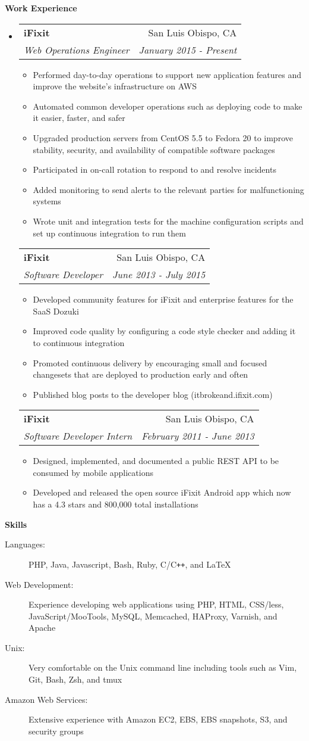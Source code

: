 \documentclass[letterpaper,11pt]{article}
\makeatletter
\newcommand{\resitem}[1]{\item #1 \vspace{-2pt}}
\newcommand{\resheading}[1]{{\large \colorbox{mygrey}{\begin{minipage}{\textwidth}{\textbf{#1 \vphantom{p\^{E}}}}\end{minipage}}}}
\newcommand{\ressubheading}[4]{
\begin{tabular*}{7.0in}{l@{\extracolsep{\fill}}r}
      \textbf{#1} & #2 \\
      \textit{#3} & \textit{#4} \\
\end{tabular*}\vspace{-6pt}}
\makeatother
\begin{document}
\resheading{Work Experience}
\begin{itemize}
\item
   \ressubheading{iFixit}{San Luis Obispo, CA}{Web Operations Engineer}{January 2015 - Present}
   \begin{itemize}
      \resitem{Performed day-to-day operations to support new application features and improve the website's infrastructure on AWS}
      \resitem{Automated common developer operations such as deploying code to make it easier, faster, and safer}
      \resitem{Upgraded production servers from CentOS 5.5 to Fedora 20 to improve stability, security, and availability of compatible software packages}
      \resitem{Participated in on-call rotation to respond to and resolve incidents}
      \resitem{Added monitoring to send alerts to the relevant parties for malfunctioning systems}
      \resitem{Wrote unit and integration tests for the machine configuration scripts and set up continuous integration to run them}
   \end{itemize}
   \ressubheading{iFixit}{San Luis Obispo, CA}{Software Developer}{June 2013 - July 2015}
   \begin{itemize}
      \resitem{Developed community features for iFixit and enterprise features for the SaaS Dozuki}
      \resitem{Improved code quality by configuring a code style checker and adding it to continuous integration}
      \resitem{Promoted continuous delivery by encouraging small and focused changesets that are deployed to production early and often}
      \resitem{Published blog posts to the developer blog (itbrokeand.ifixit.com)}
   \end{itemize}
   \ressubheading{iFixit}{San Luis Obispo, CA}{Software Developer Intern}{February 2011 - June 2013}
   \begin{itemize}
      \resitem{Designed, implemented, and documented a public REST API to be consumed by mobile applications}
      \resitem{Developed and released the open source iFixit Android app which now has a 4.3 stars and 800,000 total installations}
   \end{itemize}
\end{itemize}

\resheading{Skills}

\begin{description}
\item[Languages:]
PHP, Java, Javascript, Bash, Ruby, C/C{}\verb!++!, and \LaTeX
\item[Web Development:]
Experience developing web applications using PHP, HTML, CSS/less, JavaScript/MooTools, MySQL, Memcached, HAProxy, Varnish, and Apache
\item[Unix:]
Very comfortable on the Unix command line including tools such as Vim, Git, Bash, Zsh, and tmux
\item[Amazon Web Services:]
Extensive experience with Amazon EC2, EBS, EBS snapshots, S3, and security groups
\end{description}
\end{document}
